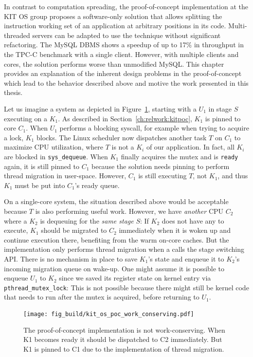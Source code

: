 \documentclass[12pt,a4paper]{book}
\begin{document}
In contrast to computation spreading, the proof-of-concept implementation at the KIT OS group proposes a software-only solution that allows splitting the instruction working set of an application at arbitrary positions in its code.
Multi-threaded servers can be adapted to use the technique without significant refactoring.
The MySQL DBMS shows a speedup of up to 17\% in throughput in the TPC-C benchmark with a single client.
However, with multiple clients and cores, the solution performs worse than unmodified MySQL.
This chapter provides an explanation of the inherent design problems in the proof-of-concept which lead to the behavior described above and motive the work presented in this thesis.

Let us imagine a system as depicted in Figure~\ref{fig:kit_os_poc_work_conserving}, starting with a \ult $U_1$ in stage $S$ executing on a \klt $K_1$.
As described in Section~\ref{ch:relwork:kitpoc}, $K_1$ is pinned to core $C_1$.
When $U_1$ performs a blocking syscall, for example when trying to acquire a lock, $K_1$ blocks.
The Linux scheduler now dispatches another task $T$ on $C_1$ to maximize CPU utilization, where $T$ is not a $K_i$ of our application.
In fact, all $K_i$ are blocked in \texttt{sys\_dequeue}.
When $K_1$ finally acquires the mutex and is \texttt{ready} again, it is still pinned to $C_1$ because the solution needs pinning to perform thread migration in user-space.
However, $C_1$ is still executing $T$, not $K_1$, and thus $K_1$ must be put into $C_1$'s ready queue.

On a single-core system, the situation described above would be acceptable because $T$ is also performing useful work.
However, we have \emph{another} CPU $C_2$ where a \klt $K_2$ is dequeuing \ults for the \emph{same stage} $S$:
If $K_2$ does not have any \ults to execute, $K_1$ should be migrated to $C_2$ immediately when it is woken up and continue execution there, benefiting from the warm on-core caches.
But the implementation only performs thread migration when a \ult calls the stage switching API.
There is no mechanism in place to save $K_1$'s state and enqueue it to $K_2$'s incoming migration queue on wake-up.
One might assume it is possible to enqueue $U_1$ to $K_2$ since we saved its register state on kernel entry via \texttt{pthread\_mutex\_lock}:
This is not possible because there might still be kernel code that needs to run after the mutex is acquired, before returning to $U_1$.

\begin{figure}[h]
    \centering
    \texttt{[image: fig\_build/kit\_os\_poc\_work\_conserving.pdf]}
    \caption{The proof-of-concept implementation is not work-conserving. When K1 becomes ready it should be dispatched to C2 immediately. But K1 is pinned to C1 due to the implementation of thread migration.}
    \label{fig:kit_os_poc_work_conserving}
\end{figure}
\end{document}

